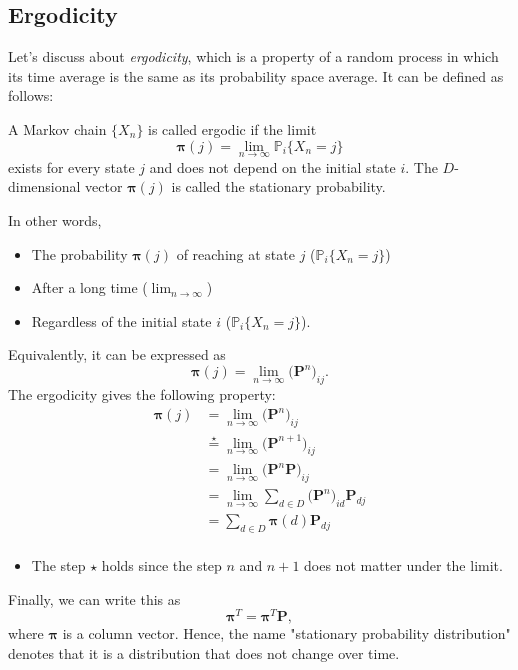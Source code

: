 \subsection{Ergodicity}

Let's discuss about \textit{ergodicity}, which is a property of a random process in which its time average is the same as its probability space average. It can be defined as follows:

\begin{definition}
A Markov chain $\{X_n\}$ is called ergodic if the limit
$$\boldsymbol{\pi} (j) = \lim_{n\to \infty}\mathbb{P}_i\{X_n=j\}$$
exists for every state $j$ and does not depend on the initial state $i$. The $D$-dimensional vector $\boldsymbol{\pi}(j)$ is called the stationary probability. 
\end{definition}
In other words, 
\begin{itemize}
	\item The probability $\boldsymbol{\pi}(j)$ of reaching at state $j$ (\ie $\mathbb{P}_i\{X_n=j\}$) 
	\item After a long time (\ie $\lim_{n\to\infty}$) 
	\item Regardless of the initial state $i$ (\ie $\mathbb{P}_i\{X_n=j\}$).
\end{itemize}
 Equivalently, it can be expressed as 
$$\boldsymbol{\pi}(j) = \lim_{n\to \infty}\big(\mathbf{P}^n\big)_{ij}.$$
The ergodicity gives the following property:
\begin{align*}
	\boldsymbol{\pi}(j) &= \lim_{n\to \infty}\big(\mathbf{P}^n\big)_{ij}\\ 
						&\overset{\star}{=} \lim_{n\to \infty}\big(\mathbf{P}^{n+1}\big)_{ij} \\
						&= \lim_{n\to \infty}\big(\mathbf{P}^{n}\mathbf{P}\big)_{ij} \\
						&= \lim_{n\to \infty}\sum_{d\in D}\big(\mathbf{P}^{n}\big)_{id}\mathbf{P}_{dj} \\
						&= \sum_{d\in D}\boldsymbol{\pi}(d)\mathbf{P}_{dj} \\
\end{align*}
\begin{itemize}
	\item The step $\star$ holds since the step $n$ and $n+1$ does not matter under the limit. 
\end{itemize}
Finally, we can write this as
$$\boldsymbol{\pi}^T = \boldsymbol{\pi}^T\mathbf{P},$$
where $\boldsymbol{\pi}$ is a column vector. Hence, the name "stationary probability distribution" denotes that it is a distribution that does not change over time.

